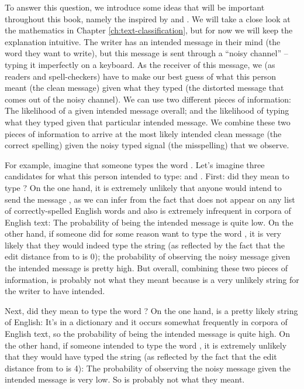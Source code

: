 To answer this question, we introduce some ideas that will be
important throughout this book, namely the  inspired by  and .  We will take a close look at the mathematics in Chapter
\ref{ch:text-classification}, but for now we will keep the explanation
intuitive.  The writer has an intended message in their mind (the word
they want to write), but this message is sent through a ``noisy
channel'' -- typing it imperfectly on a keyboard.  As the receiver of
this message, we (as readers and spell-checkers) have to make our best
guess of what this person meant (the clean message) given what they
typed (the distorted message that comes out of the noisy channel).  We
can use two different pieces of information: The likelihood of a given
intended message overall; and the likelihood of typing what they typed
given that particular intended message.  We combine these two pieces
of information to arrive at the most likely intended clean message
(the correct spelling) given the noisy typed signal (the misspelling)
that we observe.

For example, imagine that someone types the word .  Let's imagine three candidates for what this person intended to type:  and .  First: did they mean to type ?  On the one hand, it is extremely unlikely that anyone would intend to send the message , as we can infer from the fact that  does not appear on any list of correctly-spelled English words and also is extremely infrequent in corpora of English text: The probability of  being the intended message is quite low.   On the other hand, if someone did for some reason want to type the word , it is very likely that they would indeed type the string  (as reflected by the fact that the edit distance from  to  is 0); the probability of observing the noisy message  given the intended message  is pretty high.  But overall, combining these two pieces of information,  is probably not what they meant because  is a very unlikely string for the writer to have intended.

Next, did they mean to type the word ?  On the one hand,  is a pretty likely string of English: It's in a dictionary and it occurs somewhat frequently in corpora of English text, so the probability of  being the intended message is quite high.  On the other hand, if someone intended to type the word , it is extremely unlikely that they would have typed the string  (as reflected by the fact that the edit distance from  to  is 4): The probability of observing the noisy message  given the intended message  is very low.  So  is probably not what they meant.

